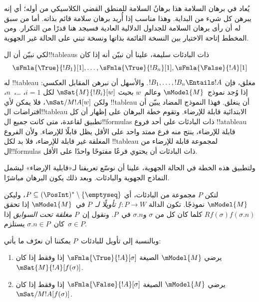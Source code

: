 \documentclass[../../../include/open-logic-section]{subfiles}
\begin{document}


\begin{editorial}
  يُعاد في برهان السلامة هذا برهانُ السلامة للمنطق القضي الكلاسيكي من أوله؛
  أي إنه يبرهن كل شيء من البداية. وهذا مناسب إذا أُريد برهان سلامة
  قائم بذاته. أما من سبق له أن رأى برهان السلامة للجداول الدلالية
  العادية فسيجد هنا قدرًا من التكرار. ومن المخطط إتاحة الاختيار بين
  النسخة القائمة بذاتها ونسخة تبني على الحالة غير الجهوية.
\end{editorial}

\begin{explain}
  لكي نبيّن أن ال!!{tableau}s ذات البادئات سليمة، علينا أن نبيّن أنه إذا
  كان
  \[
  \sFmla{\True}{!B_1}[1], \dots, \sFmla{\True}{!B_n}[1], \sFmla{\False}{!A}[1]
  \]
  له !!{tableau} مغلق، فإن $!B_1, \dots, !B_n \Entails !A$. والأسهل
  أن نبرهن المقابل العكسي: إذا وُجد نموذج~$\mModel{M}$ وعالم~$w$ بحيث
  $\mSat{M}{!B_i}[w]$ لكل $i=1$، \dots،~$n$، ولكن
  $\mSat/{M}{!A}[w]$، فلا يمكن لأي !!{tableau} أن ينغلق. فهذا النموذج
  المضاد يبيّن أن افتراضات ال!!{tableau} الابتدائية قابلة للإرضاء.
  وتقوم خطة البرهان على إظهار أن كل تطبيق لقاعدة، متى كانت جميع
  ال!!{formula}s ذات البادئات على أحد فروع !!a{tableau} قابلة للإرضاء،
  ينتج منه فرع ممتد واحد على الأقل يظل قابلًا للإرضاء. ولأن الفروع
  المغلقة غير قابلة للإرضاء، فلا بد لكل !!{tableau} لمجموعة قابلة
  للإرضاء من ال!!{formula}s ذات البادئات أن يحتوي فرعًا مفتوحًا واحدًا
  على الأقل.

  ولتطبيق هذه الخطة في الحالة الجهوية، علينا أن نوسّع تعريفنا
  لـ«قابلية الإرضاء» ليشمل النماذج الجهوية والبادئات. وبعد ذلك يكون
  البرهان مباشرًا.
\end{explain}

\begin{defn}
  لتكن $P$ مجموعة من البادئات، أي $P \subseteq (\PosInt)^*
  \setminus \{\emptyseq\}$، وليكن $\mModel{M}$ نموذجًا. تكون الدالة
  $f\colon P \to W$ \emph{تأويلًا لـ}~$P$ في~$\mModel{M}$ إذا تحقق
  $Rf(\sigma)f(\sigma.n)$ كلما كان كل من $\sigma$ و$\sigma.n$ في~$P$.
  ونقول إن~$P$ \emph{مغلقة تحت السوابق} إذا كان~$\sigma.n \in P$
  يستلزم~$\sigma \in P$.

  وبالنسبة إلى تأويل للبادئات~$P$ يمكننا أن نعرّف ما يأتي:
  \begin{enumerate}
  \item يرضي $\mModel{M}$ الصيغة $\sFmla{\True}{!A}[\sigma]$ إذا وفقط إذا
    كان $\mSat{M}{!A}[f(\sigma)]$.
  \item يرضي $\mModel{M}$ الصيغة $\sFmla{\False}{!A}[\sigma]$ إذا وفقط إذا
    كان $\mSat/{M}{!A}[f(\sigma)]$.
  \end{enumerate}
\end{defn}
\end{document}
